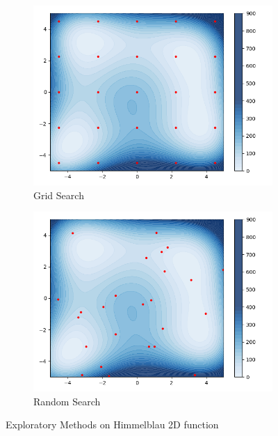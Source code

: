 \begin{figure}[h]
    \centering
    \begin{subfigure}{.45\linewidth}
      \centering
      \includegraphics[width=\linewidth]{assets/img/chap_2/plots/grid_search.png}
      \caption{Grid Search}
      \label{fig:grid_search}
    \end{subfigure}%
    \begin{subfigure}{.45\linewidth}
      \centering
      \includegraphics[width=\linewidth]{assets/img/chap_2/plots/random_search.png}
      \caption{Random Search}
      \label{fig:random_search}
    \end{subfigure}
    \caption{Exploratory Methods on Himmelblau 2D function}
    \label{fig:exploratory}
    \end{figure}

